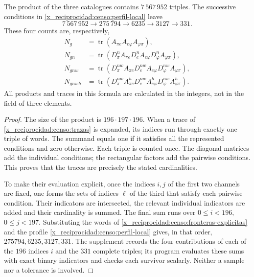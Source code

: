 \begin{theorem}
\label{x_reciprocidad:censo:teorema-conteo}
The product of the three catalogues contains \(7\,567\,952\) triples.
The successive conditions in \eqref{x_reciprocidad:censo:perfil-local} leave
\begin{equation}
 7\,567\,952\longrightarrow275\,794\longrightarrow6235
 \longrightarrow3127\longrightarrow331.
 \label{x_reciprocidad:censo:cadena-local}
\end{equation}
These four counts are, respectively,
\begin{align}
 N_g&=\operatorname{tr}(A_{\pi e}A_{e\varphi}A_{\varphi\pi}),
 \nonumber\\
 N_{gn}&=\operatorname{tr}(D_\pi^n A_{\pi e}
             D_e^n A_{e\varphi}D_\varphi^n A_{\varphi\pi}),
 \nonumber\\
 N_{gnw}&=\operatorname{tr}(D_\pi^{nw} A_{\pi e}
             D_e^{nw} A_{e\varphi}D_\varphi^{nw} A_{\varphi\pi}),
 \nonumber\\
 N_{gnwh}&=\operatorname{tr}(D_\pi^{nw} A^h_{\pi e}
             D_e^{nw} A^h_{e\varphi}D_\varphi^{nw} A^h_{\varphi\pi}).
 \label{x_reciprocidad:censo:trazas}
\end{align}
All products and traces in this formula are calculated in the integers,
not in the field of three elements.
\end{theorem}
\begin{proof}
The size of the product is \(196\cdot197\cdot196\). When a
trace of \eqref{x_reciprocidad:censo:trazas} is expanded, its indices run through exactly one
triple of words. The summand equals one if it satisfies all the represented
conditions and zero otherwise. Each triple is counted once.
The diagonal matrices add the individual conditions; the rectangular
factors add the pairwise conditions. This proves that the
traces are precisely the stated cardinalities.

To make their evaluation explicit, once the indices \(i,j\) of the first
two channels are fixed, one forms the sets of indices \(\ell\) of the third
that satisfy each pairwise condition. Their indicators are intersected,
the relevant individual indicators are added and their cardinality is summed.
The final sum runs over \(0\leq i<196\), \(0\leq j<197\).
Substituting the words of \eqref{x_reciprocidad:censo:fronteras-explicitas} and
the profile \eqref{x_reciprocidad:censo:perfil-local} gives, in that order,
\(275794,6235,3127,331\). The supplement records the four contributions
of each of the \(196\) indices \(i\) and the \(331\) complete triples;
its program evaluates these sums with exact binary indicators and checks
each survivor scalarly. Neither a sample nor a tolerance is involved.
\end{proof}

